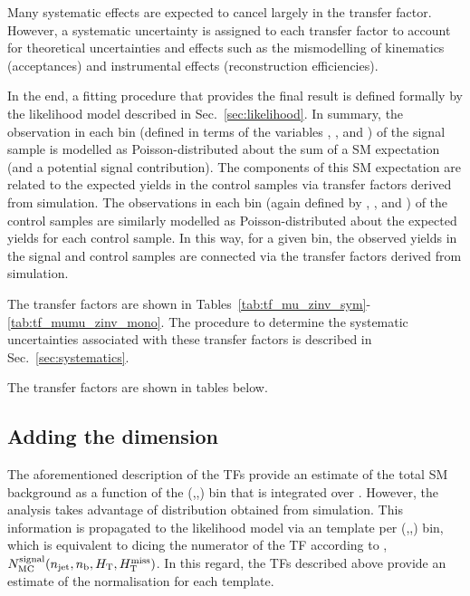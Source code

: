 Many systematic effects are expected to cancel largely in the transfer
factor. However, a systematic uncertainty is assigned to each transfer
factor to account for theoretical uncertainties and effects such as
the mismodelling of kinematics (\eg acceptances) and instrumental
effects (\eg reconstruction efficiencies).

In the end, a fitting procedure that provides the final result is
defined formally by the likelihood model described in
Sec.~\ref{sec:likelihood}. In summary, the observation in each bin
(defined in terms of the variables \njet, \nb, and \scalht) of the
signal sample is modelled as Poisson-distributed about the sum of a SM
expectation (and a potential signal contribution). The components of
this SM expectation are related to the expected yields in the control
samples via transfer factors derived from simulation. The observations
in each bin (again defined by \njet, \nb, and \scalht) of the control
samples are similarly modelled as Poisson-distributed about the
expected yields for each control sample. In this way, for a given
bin, the observed yields in the signal and control samples are
connected via the transfer factors derived from simulation. 

The transfer factors are shown in Tables~\ref{tab:tf_mu_zinv_sym}-
\ref{tab:tf_mumu_zinv_mono}. The procedure to determine the systematic
uncertainties associated with these transfer factors is described in
Sec.~\ref{sec:systematics}.


The transfer factors are shown in tables below.














\clearpage

\subsection{Adding the \mht dimension}

The aforementioned description of the TFs provide an estimate of the
total SM background as a function of the (\njet,\nb,\HT) bin that is
integrated over \mht. However, the analysis takes advantage of \mht
distribution obtained from simulation. This information is propagated
to the likelihood model via an \mht template per (\njet,\nb,\HT) bin,
which is equivalent to dicing the numerator of the TF according to
\mht, \ie $N_{\rm MC}^{\rm signal}(n_{\text{jet}},n_{\text{b}},\mbox{$H_\text{T}$},\mbox{$H_{\rm T}^{\rm miss}$})$. In this
regard, the TFs described above provide an estimate of the
normalisation for each \mht template.

